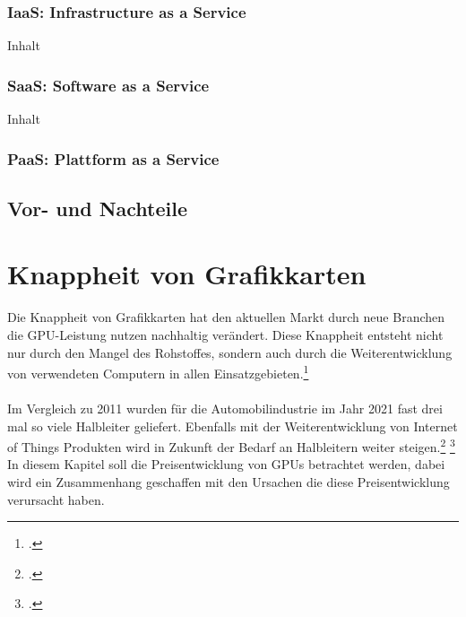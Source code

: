 \documentclass[12pt,toc=bib,toc=listof]{scrreprt}
\begin{document}

\subsection{IaaS: Infrastructure as a Service}
\label{sec:IaaS: Infrastructure as a Service}

Inhalt

\subsection{SaaS: Software as a Service}
\label{sec:SaaS: Software as a Service}

Inhalt

\subsection{PaaS: Plattform as a Service}
\label{sec:PaaS: Plattform as a Service}


\section{Vor- und Nachteile}
\label{Vor- und Nachteile}

\chapter{Knappheit von Grafikkarten} %
\label{sec:Knappheit von Grafikkarten}

Die Knappheit von Grafikkarten hat den
aktuellen Markt durch neue Branchen die GPU-Leistung nutzen nachhaltig verändert.
Diese Knappheit entsteht nicht nur durch den Mangel des Rohstoffes, sondern auch durch die 
Weiterentwicklung von verwendeten Computern in allen Einsatzgebieten.\footcite [Vgl.] []{Voas.2021}
\\
\\
Im Vergleich zu 2011 wurden für die Automobilindustrie im Jahr 2021 fast drei mal so viele
Halbleiter geliefert. Ebenfalls mit der Weiterentwicklung von Internet of Things Produkten wird in
Zukunft der Bedarf an Halbleitern weiter steigen.\footcite [Vgl.] []{Bill_McClean} \footcite [Vgl.] []{Voas.2021} 
\\In diesem Kapitel soll die Preisentwicklung von GPUs betrachtet werden, dabei wird 
ein Zusammenhang geschaffen mit den Ursachen die diese Preisentwicklung 
verursacht haben.
\\
\end{document}
